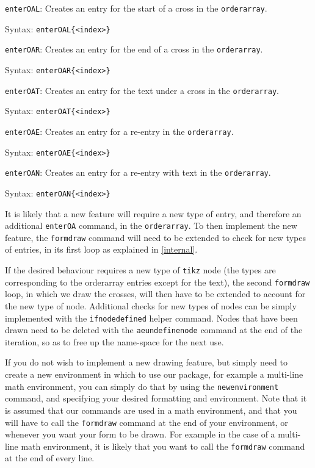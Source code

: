 \documentclass[12pt]{article}
\newenvironment{Description}[1]{%
	\begin{list}{nothing}{\setlength{\leftmargin}{#1}
			\setlength{\labelwidth}{\leftmargin}\setlength{\labelsep}{1mm}}}
	{\end{list}}
\newcommand{\BS}{\texttt{\symbol{`\\}}}
\newcommand{\Macro}[1]{\texttt{\BS#1}}
\newcommand{\FormatTeXMacro}[1]{\Macro{#1}\hfill :}
\begin{document}
\begin{Description}{4cm}
	\item[\FormatTeXMacro{enterOAL}] Creates an entry for the start of a cross in the \Macro{orderarray}.
	
	Syntax: \Macro{enterOAL\{<index>\}}
	
	\item[\FormatTeXMacro{enterOAR}] Creates an entry for the end of a cross in the \Macro{orderarray}.
	
	Syntax: \Macro{enterOAR\{<index>\}}
	
	\item[\FormatTeXMacro{enterOAT}] Creates an entry for the text under a cross in the \Macro{orderarray}.
	
	Syntax: \Macro{enterOAT\{<index>\}}
	
	\item[\FormatTeXMacro{enterOAE}] Creates an entry for a re-entry in the \Macro{orderarray}.
	
	Syntax: \Macro{enterOAE\{<index>\}}
	
	\item[\FormatTeXMacro{enterOAN}] Creates an entry for a re-entry with text in the \Macro{orderarray}.
	
	Syntax: \Macro{enterOAN\{<index>\}}
\end{Description}

It is likely that a new feature will require a new type of entry, and therefore an additional \Macro{enterOA} command, in the \Macro{orderarray}. To then implement the new feature, the \Macro{formdraw} command will need to be extended to check for new types of entries, in its first loop as explained in \ref{internal}.

If the desired behaviour requires a new type of \texttt{tikz}\cite{tikz} node (the types are corresponding to the orderarray entries except for the text), the second \texttt{formdraw} loop, in which we draw the crosses, will then have to be extended to account for the new type of node. Additional checks for new types of nodes can be simply implemented with the \Macro{ifnodedefined} helper command. Nodes that have been drawn need to be deleted with the \Macro{aeundefinenode} command at the end of the iteration, so as to free up the name-space for the next use.

If you do not wish to implement a new drawing feature, but simply need to create a new environment in which to use our package, for example a multi-line math environment, you can simply do that by using the \Macro{newenvironment} command, and specifying your desired formatting and environment. Note that it is assumed that our commands are used in a math environment, and that you will have to call the \Macro{formdraw} command at the end of your environment, or whenever you want your form to be drawn. For example in the case of a multi-line math environment, it is likely that you want to call the \Macro{formdraw} command at the end of every line.
\end{document}
